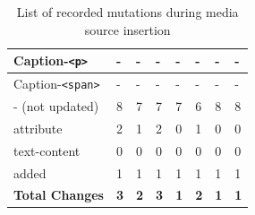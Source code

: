 \documentclass[a4paper, 10pt]{article}
\begin{document}
\begin{table}[!ht]
\begin{adjustbox}{angle=90}
\begin{tabular}{|l|l|l|l|l|l|l|l|}
      Caption-\verb|<p>|              & -                 & -               & -                   & -             & -               & -               & -               \\ \hline
      Caption-\verb|<span>|           & -                 & -               & -                   & -             & -               & -               & -               \\ \hline
      \hline
      - (not updated)                 & 8                 & 7               & 7                   & 7             & 6               & 8               & 8               \\ \hline
      \hline
      attribute                       & 2                 & 1               & 2                   & 0             & 1               & 0               & 0               \\ \hline
      text-content                    & 0                 & 0               & 0                   & 0             & 0               & 0               & 0               \\ \hline
      added                           & 1                 & 1               & 1                   & 1             & 1               & 1               & 1               \\ \hline
      \hline
      \textbf{Total Changes}          & \textbf{3}        & \textbf{2}      & \textbf{3}          & \textbf{1}    & \textbf{2}      & \textbf{1}      & \textbf{1}      \\ \hline
      \end{tabular}
  \end{adjustbox}
  \caption{List of recorded mutations during media source insertion}
  \label{tab:mutations:mediaSourceInsertion}
\end{table}
\end{document}
